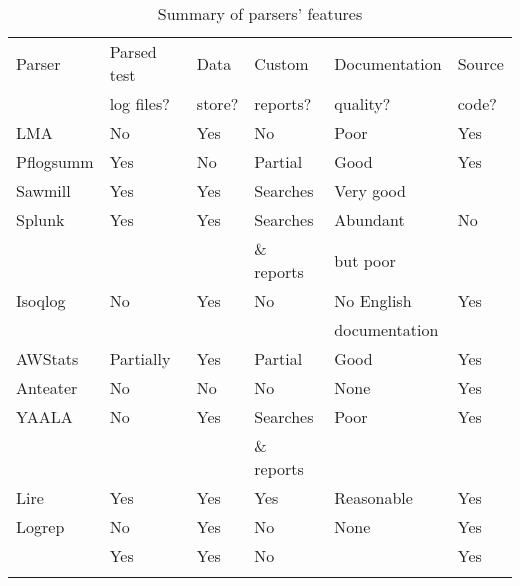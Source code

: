 \begin{table}[htb]
    \caption{Summary of parsers' features}
    \empty{}\label{Summary of parsers' features}
    \begin{tabular}{llllll}
        \tabletopline{}%
        Parser          & Parsed test   & Data              & Custom            & Documentation  & Source       \\
                        & log files?    & store?            & reports?          & quality?       & code?        \\
        \tablemiddleline{}%
        \gls{LMA}       & No            & Yes               & No                & Poor           & Yes          \\ 
        Pflogsumm       & Yes           & No                & Partial \dag{}    & Good           & Yes          \\
        Sawmill         & Yes           & Yes               & Searches          & Very good      & \nialpha{}   \\
        Splunk          & Yes           & Yes               & Searches          & Abundant       & No           \\
                        &               &                   & \& reports        & but poor       &              \\
        Isoqlog         & No            & Yes               & No                & No English     & Yes          \\
                        &               &                   &                   & documentation  &              \\
        AWStats         & Partially     & Yes               & Partial \dag{}    & Good           & Yes          \\
        Anteater        & No            & No                & No                & None           & Yes          \\
        YAALA           & No            & Yes \ddag{}       & Searches          & Poor           & Yes          \\
                        &               &                   & \& reports        &                &              \\
        Lire            & Yes           & Yes               & Yes               & Reasonable     & Yes          \\
        Logrep          & No            & Yes               & No                & None           & Yes          \\
        \parsername{}   & Yes           & Yes \nibeta{}     & No \nichi{}       & \niepsilon{}   & Yes          \\
        \tablebottomline{}%
    \end{tabular}


\end{table}
